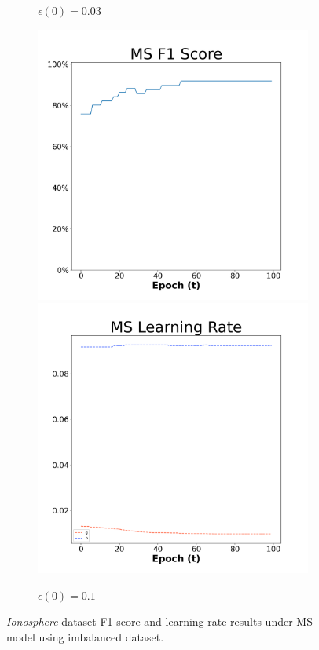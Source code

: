 \begin{figure}[H]
\begin{subfigure}{0.3\textwidth}
  \caption{$\epsilon(0)=0.03$}
\end{subfigure}\hfil %
\begin{subfigure}{0.3\textwidth}
  \includegraphics[width=\linewidth]{images/exper2/Ionosphere/MS_0.1_f1.png}
  \includegraphics[width=\linewidth]{images/exper2/Ionosphere/MS_0.1_lr.png}
  \caption{$\epsilon(0)=0.1$}\label{2ionms1}
\end{subfigure}

\caption{\textit{Ionosphere} dataset F1 score and learning rate results under MS model using imbalanced dataset.}
\end{figure}

